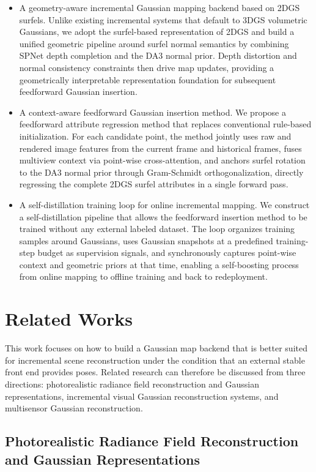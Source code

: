 \documentclass[lettersize,journal]{IEEEtran}
\begin{document}
\begin{itemize}
    \item A geometry-aware incremental Gaussian mapping backend based on 2DGS surfels. Unlike existing incremental systems that default to 3DGS volumetric Gaussians, we adopt the surfel-based representation of 2DGS and build a unified geometric pipeline around surfel normal semantics by combining SPNet depth completion and the DA3 normal prior. Depth distortion and normal consistency constraints then drive map updates, providing a geometrically interpretable representation foundation for subsequent feedforward Gaussian insertion.

    \item A context-aware feedforward Gaussian insertion method. We propose a feedforward attribute regression method that replaces conventional rule-based initialization. For each candidate point, the method jointly uses raw and rendered image features from the current frame and historical frames, fuses multiview context via point-wise cross-attention, and anchors surfel rotation to the DA3 normal prior through Gram-Schmidt orthogonalization, directly regressing the complete 2DGS surfel attributes in a single forward pass.

    \item A self-distillation training loop for online incremental mapping. We construct a self-distillation pipeline that allows the feedforward insertion method to be trained without any external labeled dataset. The loop organizes training samples around Gaussians, uses Gaussian snapshots at a predefined training-step budget as supervision signals, and synchronously captures point-wise context and geometric priors at that time, enabling a self-boosting process from online mapping to offline training and back to redeployment.
\end{itemize}

\section{Related Works}
This work focuses on how to build a Gaussian map backend that is better suited for incremental scene reconstruction under the condition that an external stable front end provides poses. Related research can therefore be discussed from three directions: photorealistic radiance field reconstruction and Gaussian representations, incremental visual Gaussian reconstruction systems, and multisensor Gaussian reconstruction.

\subsection{Photorealistic Radiance Field Reconstruction and Gaussian Representations}
\end{document}
